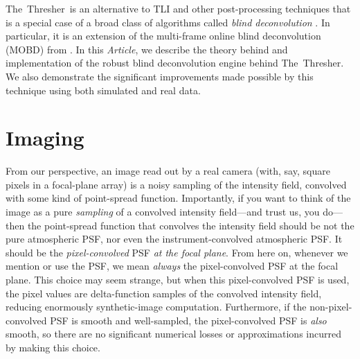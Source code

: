 \documentclass[12pt,preprint]{aastex}
\newcommand{\project}[1]{{\sffamily #1}}
\newcommand{\TheThresher}{\project{The~Thresher}}
\newcommand{\documentname}{\textsl{Article}}
\newcommand{\sectlabel}[1]{\label{sect:#1}}
\begin{document}
\TheThresher\ is an alternative to TLI and other post-processing
techniques that is a special case of a broad class of algorithms
called \emph{blind deconvolution} \citep{ayers}. In particular, it
is an extension of the multi-frame online blind deconvolution (MOBD)
from \citet{hirsch}. In this \documentname, we describe the theory
behind and implementation of the robust blind deconvolution engine
behind \TheThresher. We also demonstrate the significant improvements
made possible by this technique using both simulated and real data.

\section{Imaging} \sectlabel{imaging}

From our perspective, an image read out by a real camera (with, say,
square pixels in a focal-plane array) is a noisy sampling of the
intensity field, convolved with some kind of point-spread function.
Importantly, if you want to think of the image as a pure
\emph{sampling} of a convolved intensity field---and trust us, you
do---then the point-spread function that convolves the intensity field
should be not the pure atmospheric PSF, nor even the
instrument-convolved atmospheric PSF\@.  It should be the
\emph{pixel-convolved} PSF \emph{at the focal plane}.  From here on,
whenever we mention or use the PSF, we mean \emph{always} the
pixel-convolved PSF at the focal plane.  This choice may seem strange,
but when this pixel-convolved PSF is used, the pixel values are
delta-function samples of the convolved intensity field, reducing
enormously synthetic-image computation.  Furthermore, if the
non-pixel-convolved PSF is smooth and well-sampled, the
pixel-convolved PSF is \emph{also} smooth, so there are no significant
numerical losses or approximations incurred by making this choice.

\end{document}
